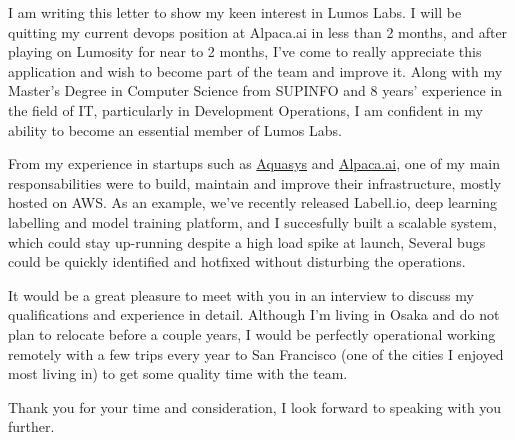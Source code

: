 \documentclass[10pt,stdletter,dateno,sigleft]{newlfm} %
\begin{document}
\begin{newlfm}


I am writing this letter to show my keen interest in Lumos Labs. I will be
quitting my current devops position at Alpaca.ai in less than 2 months, and
after playing on Lumosity for near to 2 months, I've come to really appreciate
this application and wish to become part of the team and improve it. Along with my
Master's Degree in Computer Science from SUPINFO and 8 years' experience in the
field of IT, particularly in Development Operations, I am confident in my
ability to become an essential member of Lumos Labs.

From my experience in startups such as
\href{http://www.aquasys.co.jp/}{Aquasys} and
\href{https://www.alpaca.ai/}{Alpaca.ai}, one of my main
responsabilities were to build, maintain and improve their infrastructure,
mostly hosted on AWS. As an example, we've recently released Labell.io, deep
learning labelling and model training platform, and I succesfully built a scalable
system, which could stay up-running despite a high load spike at
launch, Several bugs could be quickly identified and hotfixed without
disturbing the operations.

It would be a great pleasure to meet with you in an interview to discuss my
qualifications and experience in detail. Although I'm living in Osaka and do not
plan to relocate before a couple years, I would be perfectly operational working
remotely with a few trips every year to San Francisco (one of the cities I
enjoyed most living in) to get some quality time with the team.

Thank you for your time and consideration, I look forward to speaking with you
further.


\end{newlfm}
\end{document}
